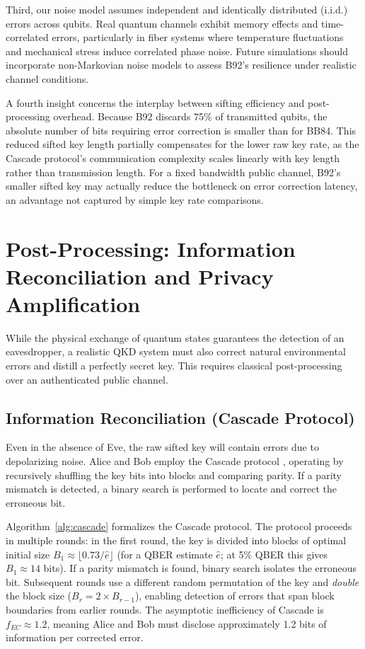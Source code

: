 \documentclass[conference]{IEEEtran}
\begin{document}
Third, our noise model assumes independent and identically distributed (i.i.d.) errors across qubits. Real quantum channels exhibit memory effects and time-correlated errors, particularly in fiber systems where temperature fluctuations and mechanical stress induce correlated phase noise. Future simulations should incorporate non-Markovian noise models to assess B92's resilience under realistic channel conditions.

A fourth insight concerns the interplay between sifting efficiency and post-processing overhead. Because B92 discards 75\% of transmitted qubits, the absolute number of bits requiring error correction is smaller than for BB84. This reduced sifted key length partially compensates for the lower raw key rate, as the Cascade protocol's communication complexity scales linearly with key length rather than transmission length. For a fixed bandwidth public channel, B92's smaller sifted key may actually reduce the bottleneck on error correction latency, an advantage not captured by simple key rate comparisons.

\section{Post-Processing: Information Reconciliation and Privacy Amplification}\label{sec:postprocessing}
While the physical exchange of quantum states guarantees the detection of an eavesdropper, a realistic QKD system must also correct natural environmental errors and distill a perfectly secret key. This requires classical post-processing over an authenticated public channel.

\subsection{Information Reconciliation (Cascade Protocol)}
Even in the absence of Eve, the raw sifted key will contain errors due to depolarizing noise. Alice and Bob employ the Cascade protocol \cite{brassard1994limitations}, operating by recursively shuffling the key bits into blocks and comparing parity. If a parity mismatch is detected, a binary search is performed to locate and correct the erroneous bit. 

Algorithm~\ref{alg:cascade} formalizes the Cascade protocol. The protocol proceeds in multiple rounds: in the first round, the key is divided into blocks of optimal initial size $B_1 \approx \lfloor 0.73 / \hat{e} \rfloor$ (for a QBER estimate $\hat{e}$; at 5\% QBER this gives $B_1 \approx 14$ bits). If a parity mismatch is found, binary search isolates the erroneous bit. Subsequent rounds use a different random permutation of the key and \textit{double} the block size ($B_r = 2 \times B_{r-1}$), enabling detection of errors that span block boundaries from earlier rounds. The asymptotic inefficiency of Cascade is $f_{EC} \approx 1.2$, meaning Alice and Bob must disclose approximately 1.2 bits of information per corrected error.
\end{document}
